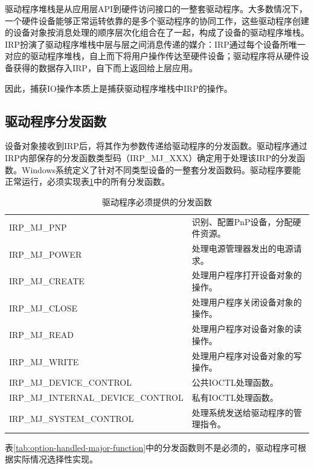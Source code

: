 驱动程序堆栈是从应用层API到硬件访问接口的一整套驱动程序。大多数情况下，一个硬件设备能够正常运转依靠的是多个驱动程序的协同工作，这些驱动程序创建的设备对象按消息处理的顺序层次化组合在了一起，构成了设备的驱动程序堆栈。IRP扮演了驱动程序堆栈中层与层之间消息传递的媒介：IRP通过每个设备所唯一对应的驱动程序堆栈，自上而下将用户操作传达至硬件设备；驱动程序将从硬件设备获得的数据存入IRP，自下而上返回给上层应用。

因此，捕获IO操作本质上是捕获驱动程序堆栈中IRP的操作。

\subsection{驱动程序分发函数}
设备对象接收到IRP后，将其作为参数传递给驱动程序的分发函数。驱动程序通过IRP内部保存的分发函数类型码（IRP\_MJ\_XXX）确定用于处理该IRP的分发函数。Windows系统定义了针对不同类型设备的一整套分发函数码。驱动程序要能正常运行，必须实现表\ref{tab:must-handled-major-function}中的所有分发函数。

\begin{table}[H]
\centering
\caption{驱动程序必须提供的分发函数}
\begin{tabular}{|ll|}
\hline IRP\_MJ\_PNP  & 识别、配置PnP设备，分配硬件资源。 \\
       IRP\_MJ\_POWER & 处理电源管理器发出的电源请求。 \\
       IRP\_MJ\_CREATE & 处理用户程序打开设备对象的操作。 \\
       IRP\_MJ\_CLOSE & 处理用户程序关闭设备对象的操作。 \\
       IRP\_MJ\_READ & 处理用户程序对设备对象的读操作。 \\
       IRP\_MJ\_WRITE & 处理用户程序对设备对象的写操作。 \\
       IRP\_MJ\_DEVICE\_CONTROL & 公共IOCTL处理函数。 \\
       IRP\_MJ\_INTERNAL\_DEVICE\_CONTROL & 私有IOCTL处理函数。 \\
       IRP\_MJ\_SYSTEM\_CONTROL & 处理系统发送给驱动程序的管理指令。 \\
\hline
\end{tabular}
\label{tab:must-handled-major-function}
\end{table}

表\ref{tab:option-handled-major-function}中的分发函数则不是必须的，驱动程序可根据实际情况选择性实现。

